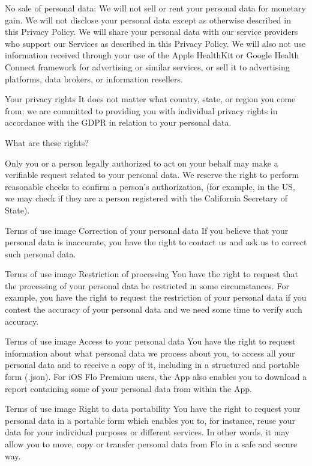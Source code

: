 No sale of personal data: We will not sell or rent your personal data for monetary gain. We will not disclose your personal data except as otherwise described in this Privacy Policy. We will share your personal data with our service providers who support our Services as described in this Privacy Policy. We will also not use information received through your use of the Apple HealthKit or Google Health Connect framework for advertising or similar services, or sell it to advertising platforms, data brokers, or information resellers.

Your privacy rights
It does not matter what country, state, or region you come from; we are committed to providing you with individual privacy rights in accordance with the GDPR in relation to your personal data. 

What are these rights?

Only you or a person legally authorized to act on your behalf may make a verifiable request related to your personal data. We reserve the right to perform reasonable checks to confirm a person’s authorization, (for example, in the US, we may check if they are a person registered with the California Secretary of State).

Terms of use image
Correction of your personal data
If you believe that your personal data is inaccurate, you have the right to contact us and ask us to correct such personal data.

Terms of use image
Restriction of processing
You have the right to request that the processing of your personal data be restricted in some circumstances. For example, you have the right to request the restriction of your personal data if you contest the accuracy of your personal data and we need some time to verify such accuracy. 

Terms of use image
Access to your personal data
You have the right to request information about what personal data we process about you, to access all your personal data and to receive a copy of it, including in a structured and portable form (.json). For iOS Flo Premium users, the App also enables you to download a report containing some of your personal data from within the App. 

Terms of use image
Right to data portability
You have the right to request your personal data in a portable form which enables you to, for instance, reuse your data for your individual purposes or different services. In other words, it may allow you to move, copy or transfer personal data from Flo in a safe and secure way. 

